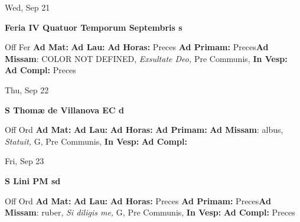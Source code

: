 \documentclass[10pt]{memoir}
\begin{document}
\begin{center}
\begin{minipage}{3.5in}
\vspace{2em}
\begin{center}Wed, Sep 21
\end{center}
\textbf{ \large Feria IV Quatuor Temporum Septembris
\textnormal{\normalsize s}}

\begin{justify}Off Fer
\textbf{Ad Mat: }
\textbf{Ad Lau: }
\textbf{Ad Horas: }Preces
\textbf{Ad Primam: }Preces\textbf{Ad Missam}: COLOR NOT DEFINED, \textit{Exsultate Deo,} Pre Communis, 
\textbf{In Vesp: }
\textbf{Ad Compl: }Preces
\end{justify}
\end{minipage}
\end{center}

\begin{center}
\begin{minipage}{3.5in}
\vspace{2em}
\begin{center}Thu, Sep 22
\end{center}
\textbf{ \large S Thomæ de Villanova EC
\textnormal{\normalsize d}}

\begin{justify}Off Ord
\textbf{Ad Mat: }
\textbf{Ad Lau: }
\textbf{Ad Horas: }
\textbf{Ad Primam: }\textbf{Ad Missam}: albus, \textit{Statuit,} G, Pre Communis, 
\textbf{In Vesp: }
\textbf{Ad Compl: }
\end{justify}
\end{minipage}
\end{center}

\begin{center}
\begin{minipage}{3.5in}
\vspace{2em}
\begin{center}Fri, Sep 23
\end{center}
\textbf{ \large S Lini PM
\textnormal{\normalsize sd}}

\begin{justify}Off Ord
\textbf{Ad Mat: }
\textbf{Ad Lau: }
\textbf{Ad Horas: }Preces
\textbf{Ad Primam: }Preces\textbf{Ad Missam}: ruber, \textit{Si diligis me,} G, Pre Communis, 
\textbf{In Vesp: }
\textbf{Ad Compl: }Preces
\end{justify}
\end{minipage}
\end{center}
\end{document}
